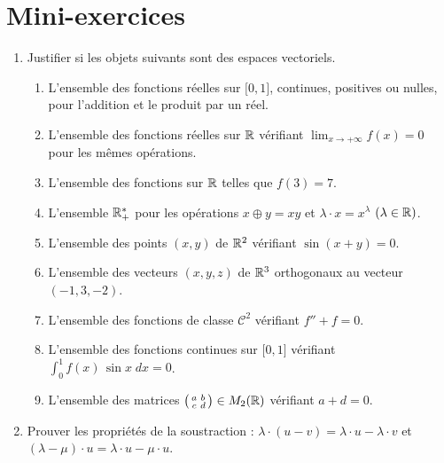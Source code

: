 \section{Mini-exercices}

\begin{frame}

\begin{miniexercice}
\begin{enumerate}
  \item  Justifier si les objets suivants sont des espaces vectoriels. 
  \begin{enumerate}
    \item L'ensemble des fonctions réelles sur
$\lbrack 0,1 \rbrack$, continues, positives ou nulles, pour
l'addition et le produit par un réel.
    \item L'ensemble des fonctions réelles sur $\mathbb{R}$ vérifiant
$\lim_{x \to+\infty} f(x)=0$ pour les mêmes opérations.
    \item L'ensemble des fonctions sur $\mathbb{R}$ telles que $f(3)=7$.
    \item L'ensemble $\mathbb{R}_+^*$ pour les opérations $x \oplus y=xy$ et 
$\lambda\cdot x=x^{\lambda}$ $(\lambda\in \mathbb{R})$.
    \item L'ensemble des points $(x,y)$ de $\mathbb{R}^2$ vérifiant
$\sin(x+y)=0$. 
    \item L'ensemble des vecteurs $(x,y,z)$ de $\mathbb{R}^3$ orthogonaux
au vecteur $(-1,3,-2)$.
    \item L'ensemble des fonctions de classe $\mathcal{C}^2$ vérifiant $f''+f=0$. 
    \item L'ensemble des fonctions continues sur $\lbrack0,1 \rbrack$
vérifiant $\int_0^1f(x) \, \sin x \; dx=0$.
    \item L'ensemble des matrices 
    $\left(\begin{smallmatrix} a & b \\ c & d \end {smallmatrix}\right) \in M_{2}(\mathbb{R})$ vérifiant $a+d=0$.   
    \end{enumerate}
  
  \item Prouver les propriétés de la soustraction : 
 $\lambda \cdot (u-v)=\lambda \cdot u -\lambda \cdot  v$  et $(\lambda -\mu) \cdot u=\lambda \cdot u-\mu \cdot u$.
\end{enumerate} 
\end{miniexercice}

\end{frame}

